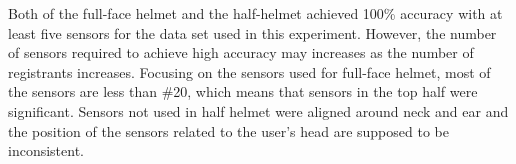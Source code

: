 \documentclass[sigchi,authordraft]{acmart}
\begin{document}




Both of the full-face helmet and the half-helmet achieved 100\% accuracy with at least five sensors for the data set used in this experiment. However, the number of sensors required to achieve high accuracy may increases as the number of registrants increases. Focusing on the sensors used for full-face helmet, most of the sensors are less than \#20, which means that sensors in the top half were significant. Sensors not used in half helmet were aligned around neck and ear and the position of the sensors related to the user's head are supposed to be inconsistent. 
\end{document}
